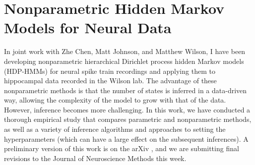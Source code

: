  
\chapter{Nonparametric Hidden Markov Models for Neural Data}

In joint work with Zhe Chen, Matt Johnson, and Matthew Wilson, I have been 
developing nonparametric hierarchical Dirichlet process hidden Markov models 
(HDP-HMMs) for neural spike train recordings and applying them to hippocampal 
data recorded in the Wilson lab. The advantage of these nonparametric methods 
is that the number of states is inferred in a data-driven way, allowing the 
complexity of the model to grow with that of the data. However, inference 
becomes more challenging. In this work, we have conducted a thorough empirical 
study that compares parametric and nonparametric methods, as well as a 
variety of inference algorithms and approaches to setting the hyperparameters 
(which can have a large effect on the subsequent inferences). A preliminary 
version of this work is on the arXiv \cite{linderman2014nonparametric}, and 
we are submitting final revisions to the Journal of Neuroscience Methods 
this week. 